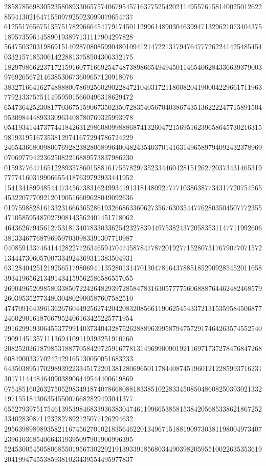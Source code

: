 \begin{DoxyCode}
      285878569830523580893306575740679545716377525420211495576158140025012622859413021647155097925923099079654737
      612551765675135751782966645477917450112996148903046399471329621073404375189573596145890193897131117904297828
      564750320319869151402870808599048010941214722131794764777262241425485454033215718530614228813758504306332175
      182979866223717215916077166925474873898665494945011465406284336639379003976926567214638530673609657120918076
      383271664162748888007869256029022847210403172118608204190004229661711963779213375751149595015660496318629472
      654736425230817703675159067350235072835405670403867435136222247715891504953098444893330963408780769325993978
      054193414473774418426312986080998886874132604721569516239658645730216315981931951673538129741677294786724229
      246543668009806769282382806899640048243540370141631496589794092432378969070697794223625082216889573837986230
      015937764716512289357860158816175578297352334460428151262720373431465319777741603199066554187639792933441952
      154134189948544473456738316249934191318148092777710386387734317720754565453220777092120190516609628049092636
      019759882816133231666365286193266863360627356763035447762803504507772355471058595487027908143562401451718062
      464362679456127531813407833033625423278394497538243720583531147711992606381334677687969597030983391307710987
      040859133746414428227726346594704745878477872019277152807317679077071572134447306057007334924369311383504931
      631284042512192565179806941135280131470130478164378851852909285452011658393419656213491434159562586586557055
      269049652098580338507224264829397285847831630577775606888764462482468579260395352773480304802900587607582510
      474709164396136267604492562742042083208566119062545433721315359584506877246029016187667952406163425225771954
      291629919306455377991403734043287526288896399587947572917464263574552540790914513571113694109119393251910760
      208252026187985318877058429725916778131496990090192116971737278476847268608490033770242429165130050051683233
      643503895170298939223345172201381280696501178440874519601212285993716231301711444846409038906449544400619869
      075485160263275052983491874078668088183385102283345085048608250393021332197155184306354550076682829493041377
      655279397517546139539846833936383047461199665385815384205685338621867252334028308711232827892125077126294632
      295639898989358211674562701021835646220134967151881909730381198004973407239610368540664319395097901906996395
      524530054505806855019567302292191393391856803449039820595510022635353619204199474553859381023439554495977837

\end{DoxyCode}
